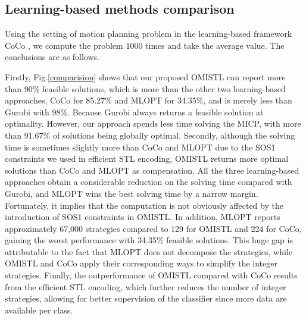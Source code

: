 \documentclass[a4paper]{report}
\begin{document}
\subsection{Learning-based methods comparison}

Using the setting of motion planning problem in the learning-based framework CoCo \cite[]{Cauligi2020}, we compute the problem 1000 times and take the average value. The conclusions are as follows.

Firstly, Fig.\ref{comparision} shows that our proposed OMISTL can report more than 90\% feasible solutions, which is more than the other two learning-based approaches, CoCo for 85.27\% and MLOPT for 34.35\%, and is merely less than Gurobi with 98\%. Because Gurobi always returns a feasible solution at optimality. However, our approach spends less time solving the MICP, with more than 91.67\% of solutions being globally optimal. Secondly, although the solving time is sometimes slightly more than CoCo and MLOPT due to the SOS1 constraints we used in efficient STL encoding, OMISTL returns more optimal solutions than CoCo and MLOPT as compensation. All the three learning-based approaches obtain a considerable reduction on the solving time compared with Gurobi, and MLOPT wins the best solving time by a narrow margin. Fortunately, it implies that the computation is not 
obviously affected by the introduction of SOS1 constraints in OMISTL. In addition, MLOPT reports approximately 67,000 strategies compared to 129 for OMISTL and 224 for CoCo, gaining the worst performance with 34.35\% feasible solutions. This huge gap is attributable to the fact that MLOPT does not decompose the strategies, while OMISTL and CoCo apply their corresponding ways to simplify the integer strategies. Finally, the outperformance of OMISTL compared with CoCo results from the efficient STL encoding, which further reduces the number of integer strategies, allowing for better supervision of the classifier since more data are available per class.
\end{document}

